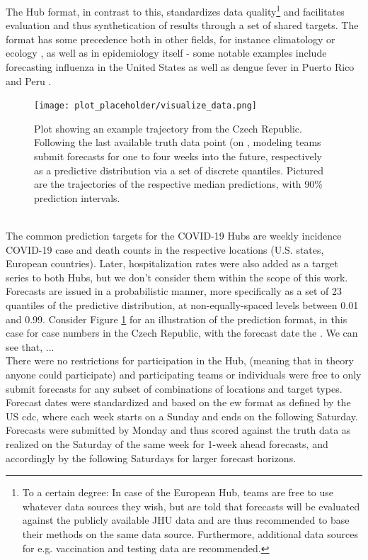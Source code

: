 The Hub format, in contrast to this, standardizes data quality\footnote{To a certain degree: In case of the European Hub, teams are free to use whatever data sources they wish, but are told that forecasts will be evaluated against the publicly available JHU data and are thus recommended to base their methods on the same data source. Furthermore, additional data sources for e.g. vaccination and testing data are recommended.} and facilitates evaluation and thus synthetication of results through a set of shared targets. The format has some precedence both in other fields, for instance climatology or ecology \citep{warszawski_inter-sectoral_2014}, as well as in epidemiology itself - some notable examples include forecasting influenza in the United States \citep{reich_collaborative_2019} as well as dengue fever in Puerto Rico and Peru \citep{johansson_open_2019}. 
\begin{figure}
\texttt{[image: plot\_placeholder/visualize\_data.png]}
\caption{ Plot showing an example trajectory from the Czech Republic. Following the last available truth data point (on , modeling teams submit forecasts for one to four weeks into the future, respectively as a predictive distribution via a set of discrete quantiles. Pictured are the trajectories of the respective median predictions, with 90\% prediction intervals.}
\label{fig:czech_predictions}
\end{figure} \\
The common prediction targets for the COVID-19 Hubs are weekly incidence COVID-19 case and death counts in the respective locations (U.S. states, European countries). Later, hospitalization rates were also added as a target series to both Hubs, but we don't consider them within the scope of this work.\\ Forecasts are issued in a probabilistic manner, more specifically as a set of 23 quantiles of the predictive distribution, at non-equally-spaced levels between 0.01 and 0.99. Consider Figure \ref{fig:czech_predictions} for an illustration of the prediction format, in this case for case numbers in the Czech Republic, with the forecast date the . We can see that, ...\\ 
There were no restrictions for participation in the Hub, (meaning that in theory anyone could participate) and participating teams or individuals were free to only submit forecasts for any subset of combinations of locations and target types. Forecast dates were standardized and based on the \ac{ew} format as defined by the US \ac{cdc}, where each week starts on a Sunday and ends on the following Saturday. Forecasts were submitted by Monday and thus scored against the truth data as realized on the Saturday of the same week for 1-week ahead forecasts, and accordingly by the following Saturdays for larger forecast horizons.\\ 

